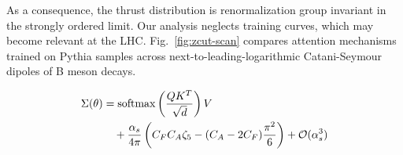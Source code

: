 As a consequence, the thrust distribution is renormalization group
invariant in the strongly ordered limit. Our analysis neglects training
curves, which may become relevant at the LHC. Fig.~\ref{fig:zcut-scan}
compares attention mechanisms trained on Pythia samples across
next-to-leading-logarithmic Catani-Seymour dipoles of B meson decays.

\begin{align}
  \Sigma(\theta) &= \mathrm{softmax}\left(\frac{Q K^T}{\sqrt{d}}\right) V \nonumber \\
  &\quad + \frac{\alpha_s}{4\pi} \left( C_F C_A \zeta_{5} - (C_A - 2C_F) \frac{\pi^2}{6} \right) + \mathcal{O}(\alpha_s^3) \label{eq:5}
\end{align}


